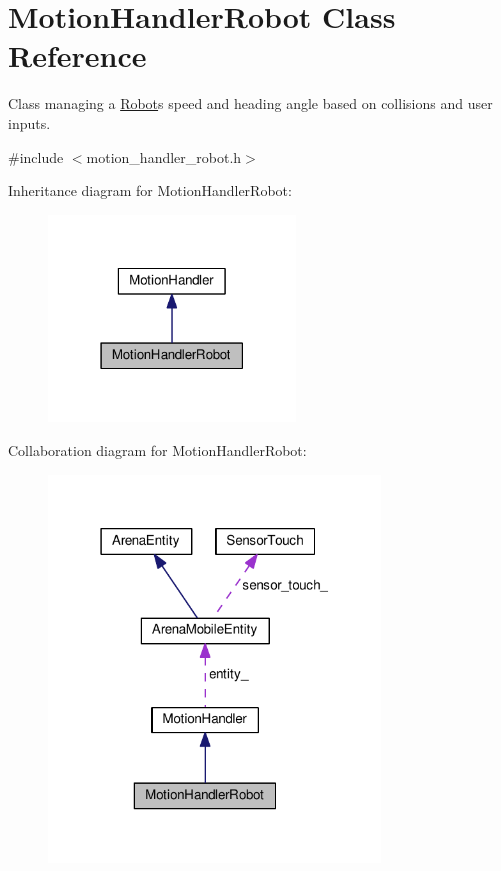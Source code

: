 \hypertarget{classMotionHandlerRobot}{}\section{Motion\+Handler\+Robot Class Reference}
\label{classMotionHandlerRobot}


Class managing a \hyperlink{classRobot}{Robot}\textquotesingle{}s speed and heading angle based on collisions and user inputs.  




{\ttfamily \#include $<$motion\+\_\+handler\+\_\+robot.\+h$>$}



Inheritance diagram for Motion\+Handler\+Robot\+:\nopagebreak
\begin{figure}[H]
\begin{center}
\leavevmode
\includegraphics[width=186pt]{classMotionHandlerRobot__inherit__graph}
\end{center}
\end{figure}


Collaboration diagram for Motion\+Handler\+Robot\+:\nopagebreak
\begin{figure}[H]
\begin{center}
\leavevmode
\includegraphics[width=250pt]{classMotionHandlerRobot__coll__graph}
\end{center}
\end{figure}
